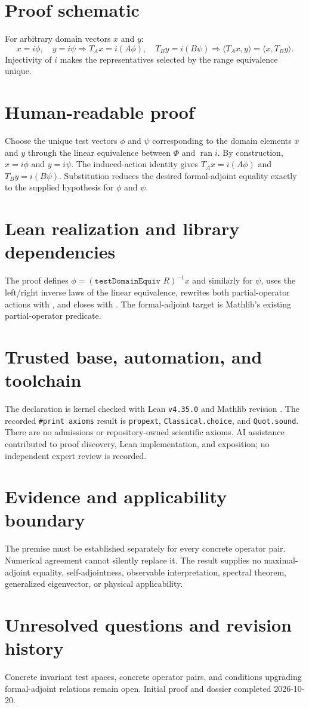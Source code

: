 \documentclass[11pt]{article}
\begin{document}
\section{Proof schematic}
For arbitrary domain vectors $x$ and $y$:
\[
 x=i\phi,\quad y=i\psi
 \Longrightarrow
 T_Ax=i(A\phi),\quad T_By=i(B\psi)
 \Longrightarrow
 \langle T_Ax,y\rangle=\langle x,T_By\rangle.
\]
Injectivity of $i$ makes the representatives selected by the range equivalence unique.

\section{Human-readable proof}
Choose the unique test vectors $\phi$ and $\psi$ corresponding to the domain elements $x$ and $y$
through the linear equivalence between $\Phi$ and $\operatorname{ran} i$. By construction,
$x=i\phi$ and $y=i\psi$. The induced-action identity gives $T_Ax=i(A\phi)$ and
$T_By=i(B\psi)$. Substitution reduces the desired formal-adjoint equality exactly to the supplied
hypothesis for $\phi$ and $\psi$.

\section{Lean realization and library dependencies}
The proof defines $\phi=(\texttt{testDomainEquiv }R)^{-1}x$ and similarly for $\psi$, uses the
left/right inverse laws of the linear equivalence, rewrites both partial-operator actions with
, and closes with
. The formal-adjoint target is Mathlib's existing partial-operator
predicate.

\section{Trusted base, automation, and toolchain}
The declaration is kernel checked with Lean \texttt{v4.35.0} and Mathlib revision
. The recorded \texttt{\#print axioms} result is
\texttt{propext}, \texttt{Classical.choice}, and \texttt{Quot.sound}. There are no admissions or
repository-owned scientific axioms. AI assistance contributed to proof discovery, Lean
implementation, and exposition; no independent expert review is recorded.

\section{Evidence and applicability boundary}
The premise must be established separately for every concrete operator pair. Numerical agreement
cannot silently replace it. The result supplies no maximal-adjoint equality, self-adjointness,
observable interpretation, spectral theorem, generalized eigenvector, or physical applicability.

\section{Unresolved questions and revision history}
Concrete invariant test spaces, concrete operator pairs, and conditions upgrading formal-adjoint
relations remain open. Initial proof and dossier completed 2026-10-20.
\end{document}
